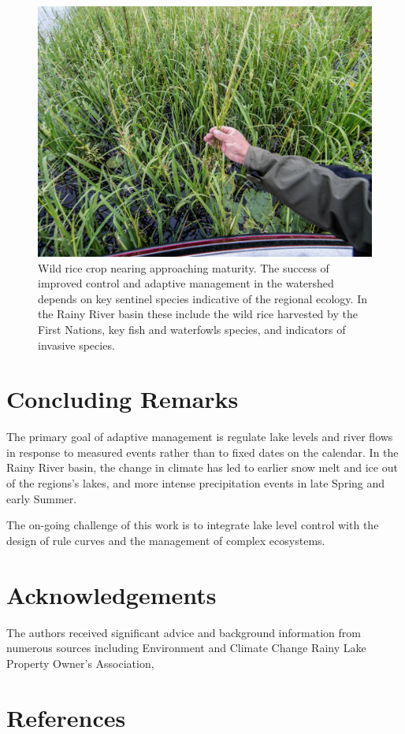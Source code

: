 \documentclass[preprint,times]{elsarticle}
\begin{document}
\begin{figure}
\includegraphics[width=\linewidth]{figures/20150804_194209.jpg}
\caption{Wild rice crop nearing approaching maturity. The success of improved control and adaptive management in the watershed depends on key sentinel species indicative of the regional ecology. In the Rainy River basin these include the wild rice harvested by the First Nations, key fish and waterfowls species, and indicators of invasive species.}\label{figure:12}
\end{figure}

\section{Concluding Remarks}

The primary goal of adaptive management is regulate lake levels and river flows in response to measured events rather than to fixed dates on the calendar. In the Rainy River basin, the change in climate has led to earlier snow melt and ice out of the regions's lakes, and more intense precipitation events in late Spring and early Summer. 

The on-going challenge of this work is to integrate lake level control with the design of rule curves and the management of complex ecosystems. 
\section{Acknowledgements}

The authors received significant advice and background information from numerous sources including Environment and Climate Change Rainy Lake Property Owner's Association, 

\section{References}


\end{document}
